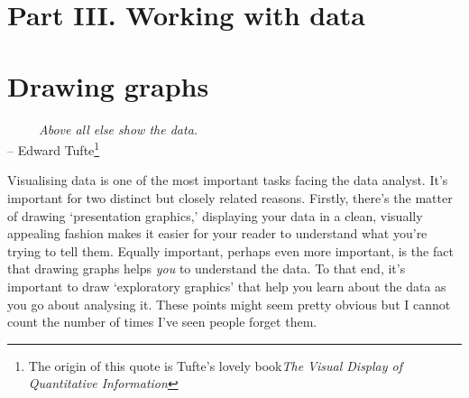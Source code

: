 \documentclass[
]{book}
\begin{document}
\hypertarget{part-iii.-working-with-data}{%
\chapter*{Part III. Working with data}\label{part-iii.-working-with-data}}

\hypertarget{graphics}{%
\chapter{Drawing graphs}\label{graphics}}

~~~~~\emph{Above all else show the data.}\\
\hspace*{0.333em}\hspace*{0.333em}\hspace*{0.333em}\hspace*{0.333em}\hspace*{0.333em}\hspace*{0.333em}\hspace*{0.333em}\hspace*{0.333em}\hspace*{0.333em}\hspace*{0.333em}\hspace*{0.333em}\hspace*{0.333em}\hspace*{0.333em}\hspace*{0.333em}\hspace*{0.333em}\hspace*{0.333em}\hspace*{0.333em}-- Edward Tufte\footnote{The origin of this quote is Tufte's lovely book\emph{The Visual Display of Quantitative Information}}

Visualising data is one of the most important tasks facing the data analyst. It's important for two distinct but closely related reasons. Firstly, there's the matter of drawing `presentation graphics,' displaying your data in a clean, visually appealing fashion makes it easier for your reader to understand what you're trying to tell them. Equally important, perhaps even more important, is the fact that drawing graphs helps \emph{you} to understand the data. To that end, it's important to draw `exploratory graphics' that help you learn about the data as you go about analysing it. These points might seem pretty obvious but I cannot count the number of times I've seen people forget them.
\end{document}
